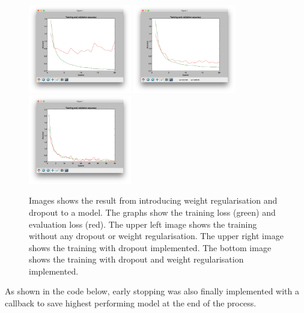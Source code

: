 \begin{figure}[!hbtp]
\begin{center}
\includegraphics[width = 0.4\textwidth]{./Images/imageclassification1}
\includegraphics[width = 0.4\textwidth]{./Images/imageclassification2}
\includegraphics[width = 0.4\textwidth]{./Images/imageclassification3}
\caption{Images shows the result from introducing weight regularisation and dropout to a model. The graphs show the training loss (green) and evaluation loss (red). The upper left image shows the training without any dropout or weight regularisation. The upper right image shows the training with dropout implemented. The bottom image shows the training with dropout and weight regularisation implemented.}
\label{fig:imageclassification}
\end{center}
\end{figure}

As shown in the code below, early stopping was also finally implemented with a callback to save
highest performing model at the end of the process.

